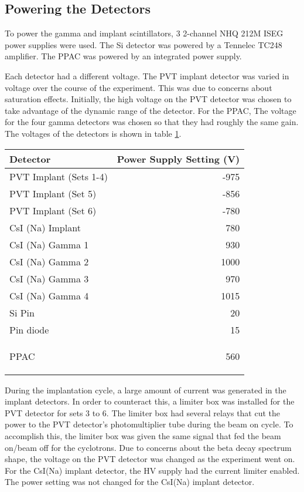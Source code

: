\documentclass[main.tex]{subfiles}
\begin{document}
\subsection{Powering the Detectors}

To power the gamma and implant scintillators, 3 2-channel NHQ 212M ISEG power supplies were used.
The Si detector was powered by a Tennelec TC248 amplifier.
The PPAC was powered by an integrated power supply.

Each detector had a different voltage. 
The PVT implant detector was varied in voltage over the course of the experiment.
This was due to concerns about saturation effects.
Initially, the high voltage on the PVT detector was chosen to take advantage of the dynamic range of the detector.
For the PPAC, 
The voltage for the four gamma detectors was chosen so that they had roughly the same gain.
The voltages of the detectors is shown in table \ref{tab:detvolt}.
\begin{table}[!hbt]
	\centering
		\begin{tabular}{l|r}
		Detector & Power Supply Setting (V) \\ \hline
		PVT Implant (Sets 1-4) & -975 \\
		PVT Implant (Set 5) & -856 \\
		PVT Implant (Set 6) & -780 \\
		CsI (Na) Implant & 780 \\ 
		CsI (Na) Gamma 1 & 930 \\
		CsI (Na) Gamma 2 & 1000 \\
		CsI (Na) Gamma 3 & 970 \\
		CsI (Na) Gamma 4 & 1015 \\
		Si Pin & 20 \\
		Pin diode & 15 \\
		PPAC & 560  
		
		\label{tab:detvolt}
		\end{tabular}
\end{table}

During the implantation cycle, a large amount of current was generated in the implant detectors.
In order to counteract this, a limiter box was installed for the PVT detector for sets 3 to 6.
The limiter box had several relays that cut the power to the PVT detector's photomultiplier tube during the beam on cycle. 
To accomplish this, the limiter box was given the same signal that fed the beam on/beam off for the cyclotrons.
Due to concerns about the beta decay spectrum shape, the voltage on the PVT detector was changed as the experiment went on. 
For the CsI(Na) implant detector, the HV supply had the current limiter enabled.
The power setting was not changed for the CsI(Na) implant detector. 
\end{document}
